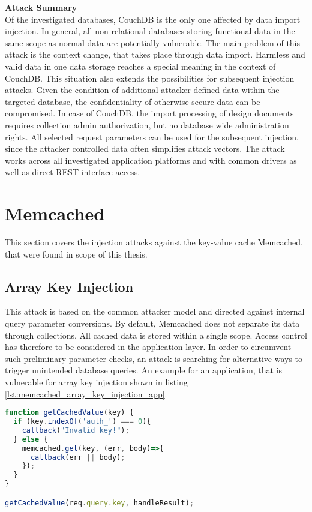 \textbf{Attack Summary} \\
Of the investigated databases, CouchDB is the only one affected by data import injection. In general, all non-relational databases storing functional data in the same scope as normal data are potentially vulnerable. The main problem of this attack is the context change, that takes place through data import. Harmless and valid data in one data storage reaches a special meaning in the context of CouchDB. This situation also extends the possibilities for subsequent injection attacks. Given the condition of additional attacker defined data within the targeted database, the confidentiality of otherwise secure data can be compromised. In case of CouchDB, the import processing of design documents requires collection admin authorization, but no database wide administration rights. All selected request parameters can be used for the subsequent injection, since the attacker controlled data often simplifies attack vectors. The attack works across all investigated application platforms and with common drivers as well as direct REST interface access. 

\section{Memcached}
This section covers the injection attacks against the key-value cache Memcached, that were found in scope of this thesis.
\subsection{Array Key Injection}
This attack is based on the common attacker model and directed against internal query parameter conversions. By default, Memcached does not separate its data through collections. All cached data is stored within a single scope. Access control has therefore to be considered in the application layer. In order to circumvent such preliminary parameter checks, an attack is searching for alternative ways to trigger unintended database queries. An example for an application, that is vulnerable for array key injection shown in listing \ref{lst:memcached_array_key_injection_app}.\\

\begin{lstlisting}[caption={Vulnerable NodeJS example for array key injection against Memcached}, label={lst:memcached_array_key_injection_app}, language=JavaScript]
function getCachedValue(key) {
  if (key.indexOf('auth_') === 0){
    callback("Invalid key!");
  } else {
    memcached.get(key, (err, body)=>{
      callback(err || body);
    });
  }
}

getCachedValue(req.query.key, handleResult);
\end{lstlisting}

